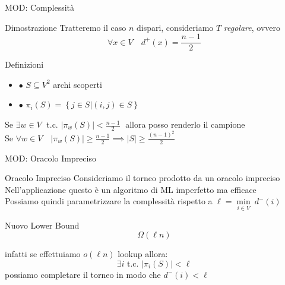 \documentclass{beamer}
\begin{document}
\begin{frame}{MOD: Complessità}
	\begin{block}{Dimostrazione}
		Tratteremo il caso $n$ dispari, consideriamo $T$ \textit{regolare}, ovvero
		$$ \forall x \in V \quad d^+(x) = \frac{n-1}{2} $$
		\pause
		\begin{center}
			\begin{minipage}{.7 \textwidth}
				\begin{block}{Definizioni}
					\begin{itemize}
						\item $\bullet$ $S \subseteq V^2$ archi scoperti
						\item $\bullet$ $\pi_i(S) = \left\{j \in S \big| (i, j) \in S \right\}$
					\end{itemize}
				\end{block}
			\end{minipage}
		\end{center}

		\pause
		Se $\exists w \in V\;$ t.c. $\left|\pi_w(S)\right| < \frac{n-1}{2}\;$ allora posso renderlo il campione \\
		\vspace{3mm}
		Se $\forall w \in V \quad \left|\pi_w(S)\right| \geq \frac{n-1}{2} \implies \left|S\right| \geq \frac{(n-1)^2}{2}$
	\end{block}
\end{frame}

\begin{frame}{MOD: Oracolo Impreciso}
	\begin{block}{Oracolo Impreciso}
		Consideriamo il torneo prodotto da un oracolo impreciso \\
		\vspace{3mm}
		Nell'applicazione questo è un algoritmo di ML imperfetto ma efficace \\
		\vspace{3mm}
		Possiamo quindi parametrizzare la complessità rispetto a $\ell = \min\limits_{i \in V} \:d^-\left(i\right)$ \\
	\end{block}
	\pause
	\begin{block}{Nuovo Lower Bound}
		$$ \Omega\left(\ell n\right) $$

		infatti se effettuiamo $o(\ell n)$ lookup allora:
		$$ \exists i \text{ t.c. } \big|\pi_i(S)\big| < \ell $$
		possiamo completare il torneo in modo che $ d^-(i) < \ell $

	\end{block}

\end{frame}
\end{document}
